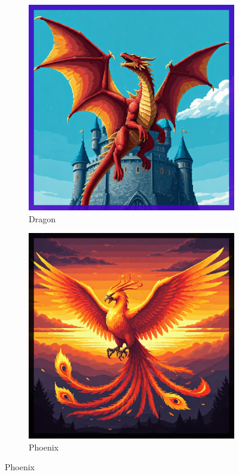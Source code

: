 \documentclass{article}
\begin{document}
\begin{figure}[h!]
\begin{subfigure}[b]{0.3\textwidth}
        \includegraphics[width=\textwidth]{gachas/final/Dragon (epic).jpg}
        \caption{Dragon}
        \label{fig:dragon}
    \end{subfigure}
    \hfill
    \begin{subfigure}[b]{0.3\textwidth}
        \centering
        \includegraphics[width=\textwidth]{gachas/final/Phoenix (legendary).jpg}
        \caption{Phoenix}
        \label{fig:phoenix}
    \end{subfigure}
    \vspace{2em}


\end{figure}
\end{document}
